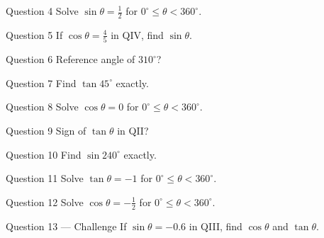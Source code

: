 \documentclass[11pt]{article}
\begin{document}
\begin{qbox}{Question 4}
Solve $\sin\theta=\tfrac12$ for $0^\circ\le\theta<360^\circ$.\workspace{2.4cm}
\end{qbox}

\begin{qbox}{Question 5}
If $\cos\theta=\tfrac45$ in QIV, find $\sin\theta$.\workspace{2.4cm}
\end{qbox}

\begin{qbox}{Question 6}
Reference angle of $310^\circ$?\workspace{2.4cm}
\end{qbox}

\begin{qbox}{Question 7}
Find $\tan45^\circ$ exactly.\workspace{2.4cm}
\end{qbox}

\begin{qbox}{Question 8}
Solve $\cos\theta=0$ for $0^\circ\le\theta<360^\circ$.\workspace{2.4cm}
\end{qbox}

\begin{qbox}{Question 9}
Sign of $\tan\theta$ in QII?\workspace{2.4cm}
\end{qbox}

\begin{qbox}{Question 10}
Find $\sin240^\circ$ exactly.\workspace{2.4cm}
\end{qbox}

\begin{qbox}{Question 11}
Solve $\tan\theta=-1$ for $0^\circ\le\theta<360^\circ$.\workspace{2.4cm}
\end{qbox}

\begin{qbox}{Question 12}
Solve $\cos\theta=-\tfrac12$ for $0^\circ\le\theta<360^\circ$.\workspace{2.4cm}
\end{qbox}

\begin{qbox}{Question 13 --- Challenge}
If $\sin\theta=-0.6$ in QIII, find $\cos\theta$ and $\tan\theta$.\workspace{3cm}
\end{qbox}

\clearpage
{}
\end{document}
